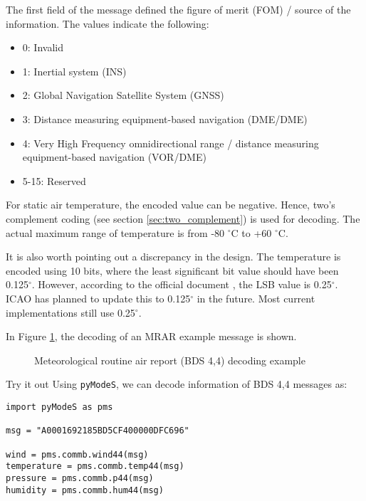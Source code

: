 The first field of the message defined the figure of merit (FOM) / source of the information. The values indicate the following:
\begin{itemize}
    \item 0: Invalid
    \item 1: Inertial system (INS)
    \item 2: Global Navigation Satellite System (GNSS)
    \item 3: Distance measuring equipment-based navigation (DME/DME)
    \item 4: Very High Frequency omnidirectional range / distance measuring equipment-based navigation (VOR/DME)
    \item 5-15: Reserved
\end{itemize}

For static air temperature, the encoded value can be negative. Hence, two's complement coding (see section \ref{sec:two_complement}) is used for decoding. The actual maximum range of temperature is from -80 $^\circ$C to +60 $^\circ$C.

It is also worth pointing out a discrepancy in the design. The temperature is encoded using 10 bits, where the least significant bit value should have been 0.125$^\circ$. However, according to the official document \cite{icao9871v1}, the LSB value is 0.25$^\circ$. ICAO has planned to update this to 0.125$^\circ$ in the future. Most current implementations still use 0.25$^\circ$. 

In Figure \ref{fig:bds44_example}, the decoding of an MRAR example message is shown.

\begin{figure}[ht]
    \centering
    
    \caption{Meteorological routine air report (BDS 4,4) decoding example}
    \label{fig:bds44_example}
  \end{figure}
  
\begin{notebox}{Try it out}
Using \texttt{pyModeS}, we can decode information of BDS 4,4 messages as: 

\begin{verbatim}
import pyModeS as pms

msg = "A0001692185BD5CF400000DFC696"

wind = pms.commb.wind44(msg)
temperature = pms.commb.temp44(msg)
pressure = pms.commb.p44(msg)
humidity = pms.commb.hum44(msg)
\end{verbatim}

\end{notebox}

